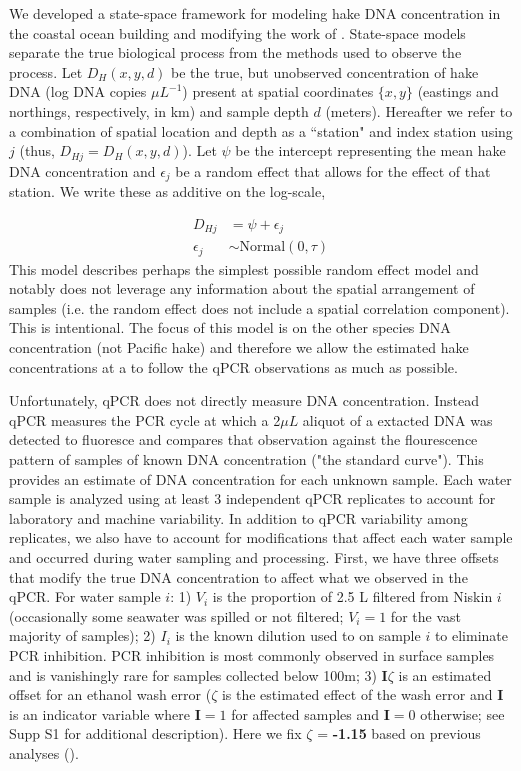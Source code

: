 \documentclass{article}
\begin{document}
We developed a state-space framework for modeling hake DNA concentration in the coastal ocean building and modifying the work of \cite{shelton2022}.  State-space models separate the true biological process from the methods used to observe the process. Let $D_H(x,y,d)$ be the true, but unobserved concentration of hake DNA (log DNA copies $\mu L^{-1}$) present at spatial coordinates $\{x,y\}$ (eastings and northings, respectively, in km) and sample depth $d$ (meters). Hereafter we refer to a combination of spatial location and depth as a ``station" and index station using $j$ (thus, $D_{Hj} = D_H(x,y,d)$). Let $\psi$ be the intercept representing the mean hake DNA concentration and $\epsilon_j$ be a random effect that allows for the effect of that station. We write these as additive on the log-scale,

\begin{align}
  D_{Hj} &= \psi + \epsilon_j \\
  \epsilon_j &\sim  \mathrm{Normal}(0,\tau)
\end{align}
This model describes perhaps the simplest possible random effect model and notably does not leverage any information about the spatial arrangement of samples (i.e. the random effect does not include a spatial correlation component).  This is intentional.  The focus of this model is on the other species DNA concentration (not Pacific hake) and therefore we allow the estimated hake concentrations at a to follow the qPCR observations as much as possible. 

Unfortunately, qPCR does not directly measure DNA concentration. Instead qPCR measures the PCR cycle at which a 2$\mu L$ aliquot of a extacted DNA was detected to fluoresce and compares that observation against the flourescence pattern of samples of known DNA concentration ("the standard curve"). This provides an estimate of DNA concentration for each unknown sample. Each water sample is analyzed using at least 3 independent qPCR replicates to account for laboratory and machine variability. In addition to qPCR variability among replicates, we also have to account for modifications that affect each water sample and occurred during water sampling and processing. First, we have three offsets that modify the true DNA concentration to affect what we observed in the qPCR. For water sample $i$: 1) $V_i$ is the proportion of 2.5 L filtered from Niskin $i$ (occasionally some seawater was spilled or not filtered; $V_i =1$ for the vast majority of samples); 2) $I_i$ is the known dilution used to on sample $i$ to eliminate PCR inhibition. PCR inhibition is most commonly observed in surface samples and is vanishingly rare for samples collected below 100m; 3) $\mathbf{I}\zeta$ is an estimated offset for an ethanol wash error ($\zeta$ is the estimated effect of the wash error and $\mathbf{I}$ is an indicator variable where $\mathbf{I}=1$ for affected samples and $\mathbf{I}=0$ otherwise; see \cite{shelton2022} Supp S1 for additional description). Here we fix $\zeta$ = \textbf{-1.15} based on previous analyses (\cite{shelton2022}).
\end{document}
